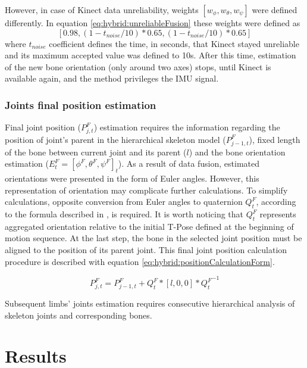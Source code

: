 \documentclass[sensors,article,submit,moreauthors,pdftex,10pt,a4paper]{mdpi}
\begin{document}
However, in case of Kinect data unreliability, weights $[w_\phi , w_\theta , w_\psi]$ were defined differently. In equation \ref{eq:hybrid:unreliableFusion} these weights were defined as $$[0.98,(1-t_{noise}/10)*0.65,(1-t_{noise}/10)*0.65]$$ where $t_{noise}$ coefficient defines the time, in seconds, that Kinect stayed unreliable and its maximum accepted value was defined to 10s. After this time, estimation of the new bone orientation (only around two axes) stops, until Kinect is available again, and the method privileges the IMU signal.

\subsubsection{Joints final position estimation}
Final joint position ($P_{j,t}^F$) estimation requires the information regarding the position of joint’s parent in the hierarchical skeleton model ($P_{j-1,t}^F$), fixed length of the bone between current joint and its parent ($l$) and the bone orientation estimation ($E_t^F=[\phi^F,\theta^F,\psi^F]_t$). As a result of data fusion, estimated orientations were presented in the form of Euler angles. However, this representation of orientation may complicate further calculations. To simplify calculations, opposite conversion from Euler angles to quaternion $Q_t^F$, according to the formula described in \cite{Dunn2011}, is required. It is worth noticing that $Q_t^F$ represents aggregated orientation relative to the initial T-Pose defined at the beginning of motion sequence. At the last step, the bone in the selected joint position must be aligned to the position of its parent joint. This final joint position calculation procedure is described with equation \ref{eq:hybrid:positionCalculationForm}.

\begin{equation} 	
	P_{j,t}^F=P_{j-1,t}^F+Q_t^F*[l,0,0]*{Q_t^F}^{-1}     
	\label{eq:hybrid:positionCalculationForm}              	
\end{equation}

Subsequent limbs’ joints estimation requires consecutive hierarchical analysis of skeleton joints and corresponding bones.

\section{Results}

\end{document}
